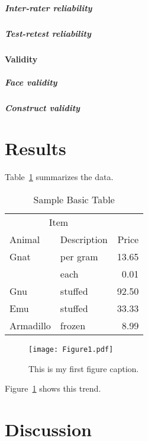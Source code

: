 \documentclass[stu]{apa7}
\begin{document}
\subparagraph{Inter-rater reliability}
\lipsum[10]

\subparagraph{Test-retest reliability}
\lipsum[11]

\paragraph{Validity}
\lipsum[12]

\subparagraph{Face validity}
\lipsum[13]

\subparagraph{Construct validity}
\lipsum[14]

\section{Results}
Table~\ref{tab:BasicTable} summarizes the data. \lipsum[15]

\begin{table}
	\caption{Sample Basic Table}
	\label{tab:BasicTable}
	\begin{tabular}{@{}llr@{}}         \toprule
		\multicolumn{2}{c}{Item}        \\ \cmidrule(r){1-2}
		Animal    & Description & Price \\ \midrule
		Gnat      & per gram    & 13.65 \\
		          & each        & 0.01  \\
		Gnu       & stuffed     & 92.50 \\
		Emu       & stuffed     & 33.33 \\
		Armadillo & frozen      & 8.99  \\ \bottomrule
	\end{tabular}
\end{table}

\begin{figure}
	\caption{This is my first figure caption.}
	\texttt{[image: Figure1.pdf]}
	\label{fig:Figure1}
\end{figure}

Figure~\ref{fig:Figure1} shows this trend. \lipsum[16]

\section{Discussion}
\lipsum[17]

\lipsum[18]

\lipsum[19]

\printbibliography
\end{document}
